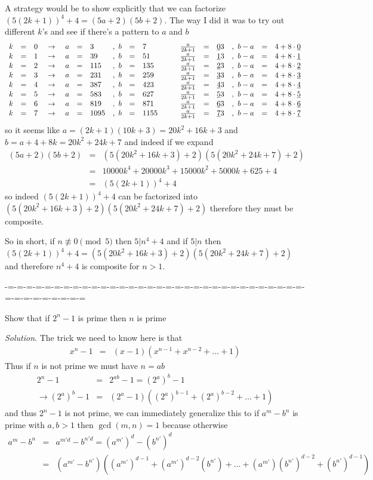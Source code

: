 \documentclass[aps,preprint,preprintnumbers,nofootinbib,showpacs,prd]{revtex4-1}
\newcommand{\nbea}{\begin{eqnarray*}}
\newcommand{\neea}{\end{eqnarray*}}
\begin{document}
A strategy would be to show explicitly that we can factorize $(5(2k+1))^4 + 4 = (5a + 2)(5b + 2)$. The way I did it was to try out different $k$'s and see if there's a pattern to $a$ and $b$
%
\nbea
\begin{array}{r c l c r c l r c l c r c l r c l}
k &=& 0 & ~\to~ & a &=& 3 &,~b&=&7 &~~~& \frac{a}{2k+1} &=& \underline{0}3 &,~b-a &=& 4  + 8\cdot \underline{0}\\
k &=& 1 & ~\to~ & a &=& 39 &,~b&=&51 &~~~& \frac{a}{2k+1} &=& \underline{1}3 &,~b-a &=& 4 + 8\cdot \underline{1} \\
k &=& 2 & ~\to~ & a &=& 115 &,~b&=&135 &~~~& \frac{a}{2k+1} &=& \underline{2}3 &,~b-a &=& 4  + 8\cdot \underline{2}\\
k &=& 3 & ~\to~ & a &=& 231 &,~b&=&259 &~~~& \frac{a}{2k+1} &=& \underline{3}3 &,~b-a &=& 4  + 8\cdot \underline{3}\\
k &=& 4 & ~\to~ & a &=& 387 &,~b&=&423 &~~~& \frac{a}{2k+1} &=& \underline{4}3 &,~b-a &=& 4  + 8\cdot \underline{4}\\
k &=& 5 & ~\to~ & a &=& 583 &,~b&=&627 &~~~& \frac{a}{2k+1} &=& \underline{5}3 &,~b-a &=& 4  + 8\cdot \underline{5}\\
k &=& 6 & ~\to~ & a &=& 819 &,~b&=&871 &~~~& \frac{a}{2k+1} &=& \underline{6}3 &,~b-a &=& 4  + 8\cdot \underline{6}\\
k &=& 7 & ~\to~ & a &=& 1095 &,~b&=&1155 &~~~& \frac{a}{2k+1} &=& \underline{7}3 &,~b-a &=& 4  + 8\cdot \underline{7}
\end{array}
\neea
%
so it seems like $a = (2k+1)(10k+3) = 20k^2+16k+3$ and $b = a + 4 + 8k= 20k^2+24k+7$ and indeed if we expand
%
\nbea
(5a + 2)(5b + 2) & = & (5(20k^2+16k+3) + 2)(5(20k^2+24k+7) + 2) \\
& = & 10000k^4+20000k^3+15000k^2+5000k+625 + 4 \\
& = & (5(2k+1))^4 + 4
\neea
%
so indeed $(5(2k+1))^4 + 4$ can be factorized into $(5(20k^2+16k+3) + 2)(5(20k^2+24k+7) + 2)$ therefore they must be composite.

So in short, if $n \not\equiv 0 \pmod{5}$ then $5|n^4 + 4$ and if $5|n$ then $(5(2k+1))^4 + 4 = (5(20k^2+16k+3) + 2)(5(20k^2+24k+7) + 2)$ and therefore $n^4 + 4$ is composite for $n>1$.

-=-=-=-=-=-=-=-=-=-=-=-=-=-=-=-=-=-=-=-=-=-=-=-=-=-=-=-=-=-=-=-=-=-=-=-=-=-=-=-=-=

Show that if $2^n - 1$ is prime then $n$ is prime

{\it Solution}. The trick we need to know here is that
%
\nbea
x^n - 1 & = & (x - 1)(x^{n-1} + x^{n-2} + \dots + 1)
\neea
%
Thus if $n$ is not prime we must have $n = ab$
%
\nbea
2^n - 1 & = & 2^{ab} - 1 = (2^a)^b - 1 \\
\to (2^a)^b - 1 & = & (2^a - 1)((2^a)^{b-1} + (2^a)^{b-2} + \dots + 1)
\neea
%
and thus $2^n - 1$ is not prime, we can immediately generalize this to if $a^m - b^n$ is prime with $a,b > 1$ then $\gcd(m,n) = 1$ because otherwise
%
\nbea
a^m - b^n & = & a^{m'd} - b^{n'd} = (a^{m'})^d - (b^{n'})^d \\
& = & \left (a^{m'} - b^{n'} \right ) \left ((a^{m'})^{d-1} + (a^{m'})^{d-2} (b^{n'})+ \dots + (a^{m'})(b^{n'})^{d-2} + (b^{n'})^{d-1} \right )
\neea
%
\end{document}
